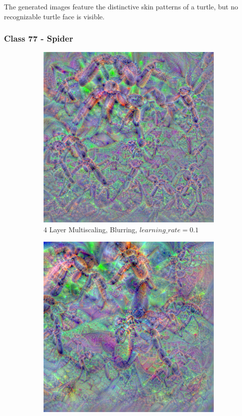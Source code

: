 The generated images feature the distinctive skin patterns of a turtle, but no recognizable turtle face is visible.

\newpage
\subsubsection{Class 77 - Spider}

\begin{figure}
    \captionsetup{justification=centering}

    \begin{subfigure}[t]{0.46\textwidth}
        \captionsetup{justification=centering}
        \centering
        \includegraphics[width=.7\linewidth]{figuras/feat_vis/experiments/classes/cl77/random_image_ci77_lr1e-1_pl4.png}
        \caption{4 Layer Multiscaling, Blurring, \(learning\_rate = 0.1\)}
    \end{subfigure}
    \hfill
    \begin{subfigure}[t]{0.46\textwidth}
        \captionsetup{justification=centering}
        \centering
        \includegraphics[width=.7\linewidth]{figuras/feat_vis/experiments/classes/cl77/random_image_ci77_lr1e-1_pl6.png}

\end{subfigure}
\end{figure}
